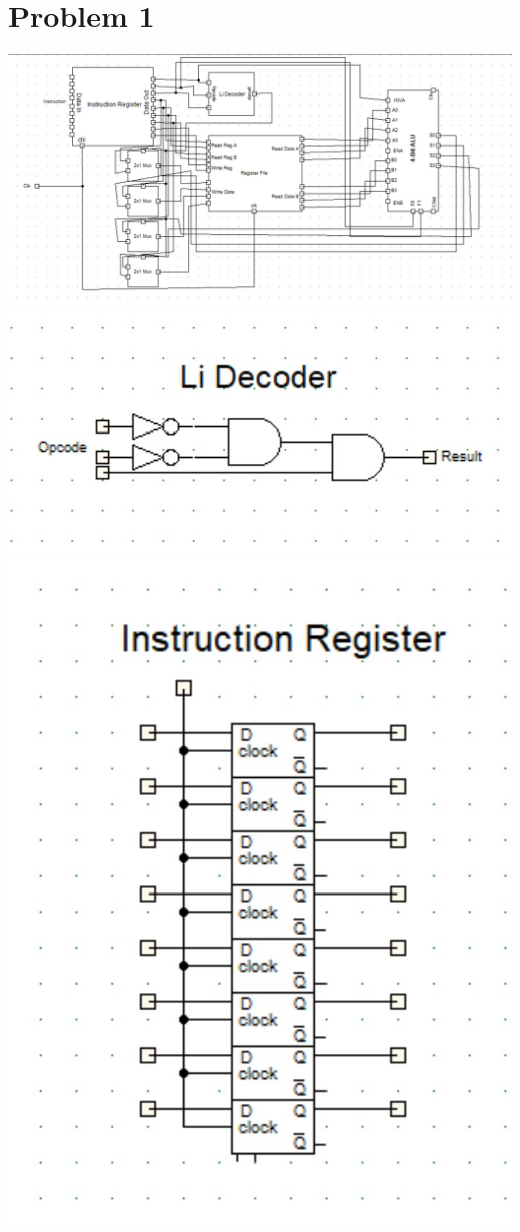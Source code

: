 \documentclass{article}
\newenvironment{problem}[1]{
  \nobreak\section*{Problem #1}
}{}
\begin{document}
\begin{problem}{1}
    \begin{center}
      \includegraphics[scale=0.45]{images/CPU.jpg}
      \includegraphics[scale=1]{images/LiDecoder.jpg}
      \includegraphics[scale=1]{images/InstructionRegister.jpg}
    \end{center}


\end{problem}
\end{document}
